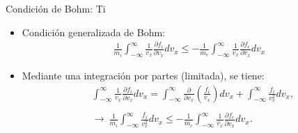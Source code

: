 \documentclass[11pt]{beamer}
\begin{document}
        \begin{frame}{Condici\'on de Bohm: Ti }
        \fontsize{7pt}{9}\selectfont
        \begin{itemize}
            \item Condición generalizada de Bohm:
            \begin{align*}
                 \frac{1}{m_i} \int_{-\infty}^{\infty} \frac{1}{v_x}\frac{\partial f_i}{\partial v_x}dv_x \leq  -\frac{1}{m_e} \int_{-\infty}^{\infty} \frac{1}{v_x}\frac{\partial f_e}{\partial v_x} dv_x
            \end{align*} 
            \item Mediante una integración por partes (limitada), se tiene: 
            \begin{align*}
                &\int _{-\infty}^{\infty} \frac{1}{v_x}\frac{\partial f_i}{\partial v_x}dv_x = \int_{-\infty}^{\infty}\frac{\partial }{\partial v_x} \left( \frac{f_i}{v_x} \right)dv_x + \int_{-\infty}^{\infty}\frac{f_i}{v_x^2}dv_x, \\ \\ 
                 &\rightarrow \ \frac{1}{m_i} \int_{-\infty}^{\infty} \frac{f_i}{v_x^2}dv_x \leq  -\frac{1}{m_e} \int_{-\infty}^{\infty} \frac{1}{v_x}\frac{\partial f_e}{\partial v_x} dv_x.
            \end{align*} 
            
        \end{itemize}
        \end{frame}
   
\end{document}
